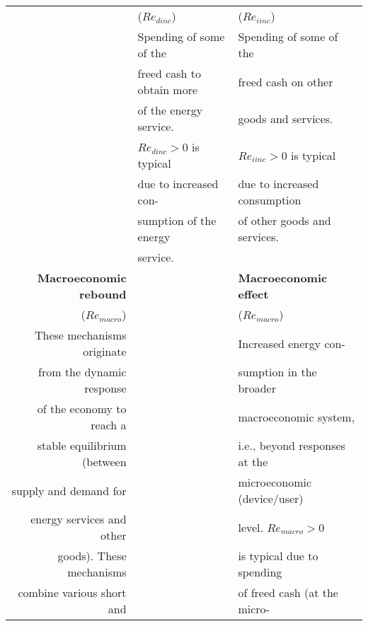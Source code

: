 \begin{table}
\begin{center}
\begin{tabular}{ r l l }
                                   & ($Re_{dinc}$)                                & ($Re_{iinc}$)   \\
                                   & Spending of some of the                      & Spending of some of the    \\
                                   & freed cash to obtain more                    & freed cash on other     \\ 
                                   & of the energy service.                       & goods and services.   \\
                                   & $Re_{dinc} > 0$ is typical                   & $Re_{iinc} > 0$ is typical  \\
                                   & due to increased con-                        & due to increased consumption   \\
                                   & sumption of the energy                       & of other goods and services. \\
                                   & service.                                     & \\
\midrule
\textbf{Macroeconomic rebound}     &                                              & \textbf{Macroeconomic effect}  \\
\multicolumn{1}{r}{($Re_{macro}$)} &                                              & ($Re_{macro}$)  \\
These mechanisms originate         &                                              & Increased energy con- \\
from the dynamic response          &                                              & sumption in the broader    \\
of the economy to reach a          &                                              & macroeconomic system,  \\
stable equilibrium (between        &                                              & i.e., beyond responses at the    \\
supply and demand for              &                                              & microeconomic (device/user)  \\
energy services and other          &                                              & level. $Re_{macro} > 0$  \\
goods). These mechanisms           &                                              & is typical due to spending  \\
combine various short and          &                                              & of freed cash (at the micro- \\

\end{tabular}
\end{center}
\end{table}
